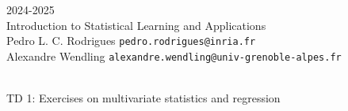 \begin{flushleft}
 \hfill {} 2024-2025 \\
Introduction to Statistical Learning and Applications \\
Pedro L. C. Rodrigues   \hfill  \texttt{pedro.rodrigues@inria.fr} \\
Alexandre Wendling \hfill \texttt{alexandre.wendling@univ-grenoble-alpes.fr} \\

\HRuleTop\\
\begin{center}
\Large{TD 1: Exercises on multivariate statistics and regression}
\end{center}
\HRuleBottom
\end{flushleft}
